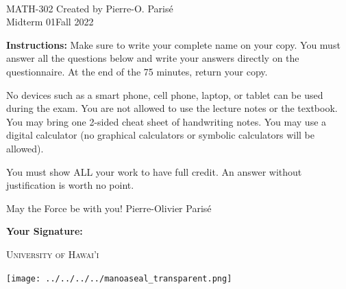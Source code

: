 \documentclass[addpoints, 12pt]{exam}%
\theoremstyle{definition}
\begin{document}
	\noindent \hrulefill \\
	\noindent MATH-302 \hfill Created by Pierre-O. Paris{\'e}\\
	Midterm 01\hfill Fall 2022\\\vspace*{-0.7cm}

\noindent\hrulefill
	
\vspace*{1cm}

\noindent{}

\vspace*{1cm}
\begin{center}
\gradetable[h][questions]
\end{center}
\vspace*{1cm}

{\bf Instructions:} Make sure to write your complete name on your copy. You must answer all the questions below and write your answers directly on the questionnaire. At the end of the 75 minutes, return your copy. 

No devices such as a smart phone, cell phone, laptop, or tablet can be used during the exam. You are not allowed to use the lecture notes or the textbook. You may bring one 2-sided cheat sheet of handwriting notes. You may use a digital calculator (no graphical calculators or symbolic calculators will be allowed).

You must show ALL your work to have full credit. An answer without justification is worth no point.

\vspace*{2cm}
\noindent May the Force be with you! \hfill Pierre-Olivier Parisé

\vfill

\noindent\textbf{Your Signature:} \hrulefill

\vspace*{1cm}

\begin{center}
\begin{minipage}{0.29\textwidth}
\begin{Huge}
\textsc{University of Hawai'i}
\end{Huge}
\end{minipage}
\begin{minipage}{0.12\textwidth}
\texttt{[image: ../../../../manoaseal\_transparent.png]}
\end{minipage}
\end{center}
\end{document}
